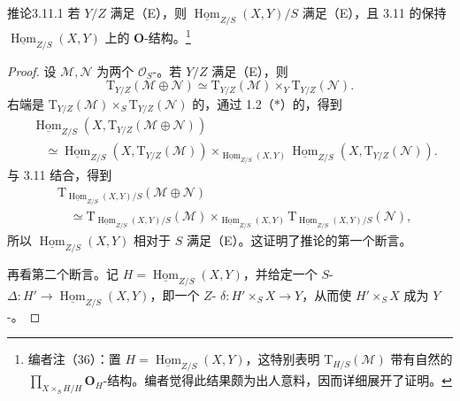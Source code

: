 \begin{SGAresult}{推论}{3.11.1}
若 $Y/Z$ 满足（E），则 $\underline{\operatorname{Hom}}_{Z/S}(X,Y)/S$ 满足（E），且 3.11 的保持 $\underline{\operatorname{Hom}}_{Z/S}(X,Y)$ 上的 $\mathbf O$-结构。\footnote{编者注（36）：置 $H=\underline{\operatorname{Hom}}_{Z/S}(X,Y)$，这特别表明 $\mathrm T_{H/S}(\mathcal M)$ 带有自然的 $\prod_{X\times_S H/H}\mathbf O_H$-结构。编者觉得此结果颇为出人意料，因而详细展开了证明。}
\end{SGAresult}
\begin{proof}
设 $\mathcal M,\mathcal N$ 为两个 $\mathcal O_S$-。若 $Y/Z$ 满足（E），则
\[
\mathrm T_{Y/Z}(\mathcal M\oplus\mathcal N)
\simeq\mathrm T_{Y/Z}(\mathcal M)\times_Y\mathrm T_{Y/Z}(\mathcal N).
\]
右端是 $\mathrm T_{Y/Z}(\mathcal M)\times_S\mathrm T_{Y/Z}(\mathcal N)$ 的，通过 1.2（$*$）的，得到
\[
\begin{aligned}
{}&\underline{\operatorname{Hom}}_{Z/S}(X,\mathrm T_{Y/Z}(\mathcal M\oplus\mathcal N))\\
&\quad\simeq\underline{\operatorname{Hom}}_{Z/S}(X,\mathrm T_{Y/Z}(\mathcal M))
\times_{\underline{\operatorname{Hom}}_{Z/S}(X,Y)}
\underline{\operatorname{Hom}}_{Z/S}(X,\mathrm T_{Y/Z}(\mathcal N)).
\end{aligned}
\]
与 3.11 结合，得到
\[
\begin{aligned}
{}&\mathrm T_{\underline{\operatorname{Hom}}_{Z/S}(X,Y)/S}(\mathcal M\oplus\mathcal N)\\
&\quad\simeq\mathrm T_{\underline{\operatorname{Hom}}_{Z/S}(X,Y)/S}(\mathcal M)
\times_{\underline{\operatorname{Hom}}_{Z/S}(X,Y)}
\mathrm T_{\underline{\operatorname{Hom}}_{Z/S}(X,Y)/S}(\mathcal N),
\end{aligned}
\]
所以 $\underline{\operatorname{Hom}}_{Z/S}(X,Y)$ 相对于 $S$ 满足（E）。这证明了推论的第一个断言。

再看第二个断言。记 $H=\underline{\operatorname{Hom}}_{Z/S}(X,Y)$，并给定一个 $S$- $\Delta:H'\to\underline{\operatorname{Hom}}_{Z/S}(X,Y)$，即一个 $Z$- $\delta:H'\times_S X\to Y$，从而使 $H'\times_S X$ 成为 $Y$-。


\end{proof}
